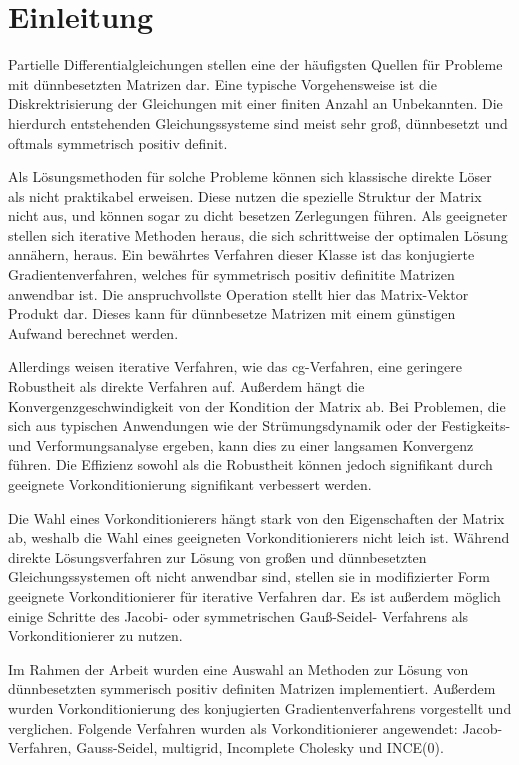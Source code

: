 \section{Einleitung}
Partielle Differentialgleichungen stellen eine der h\"aufigsten Quellen f\"ur Probleme mit d\"unnbesetzten Matrizen dar. Eine typische Vorgehensweise ist die Diskrektrisierung der Gleichungen mit einer finiten Anzahl an Unbekannten. Die hierdurch entstehenden Gleichungssysteme sind meist sehr gro\ss, d\"unnbesetzt und oftmals symmetrisch positiv definit.\cite{saad03:IMS}


Als L\"osungsmethoden f\"ur solche Probleme k\"onnen sich klassische direkte L\"oser  als nicht praktikabel erweisen. Diese nutzen die spezielle Struktur der Matrix nicht aus, und k\"onnen sogar zu dicht besetzen Zerlegungen f\"uhren. 
Als geeigneter stellen sich iterative Methoden heraus, die sich schrittweise der optimalen L\"osung ann\"ahern, heraus. Ein bew\"ahrtes Verfahren dieser Klasse ist das konjugierte Gradientenverfahren, welches für  symmetrisch positiv definitite Matrizen anwendbar ist. Die anspruchvollste Operation stellt hier das Matrix-Vektor Produkt dar. Dieses kann f\"ur d\"unnbesetze Matrizen mit einem g\"unstigen Aufwand berechnet werden. \cite{GoluVanl96}

Allerdings weisen iterative Verfahren, wie das cg-Verfahren, eine geringere Robustheit als direkte Verfahren auf. Au{\ss}erdem h\"angt die Konvergenzgeschwindigkeit von der Kondition der Matrix ab. Bei Problemen, die sich aus typischen Anwendungen wie der Str\"umungsdynamik oder der Festigkeits- und Verformungsanalyse ergeben, kann dies zu einer langsamen Konvergenz f\"uhren.
Die Effizienz sowohl als die Robustheit k\"onnen jedoch signifikant durch geeignete Vorkonditionierung signifikant verbessert werden. \cite{saad03:IMS}

Die Wahl eines Vorkonditionierers h\"angt stark von den Eigenschaften der Matrix ab, weshalb die Wahl eines geeigneten Vorkonditionierers nicht leich ist. W\"ahrend direkte L\"osungsverfahren zur L\"osung von gro{\ss}en und d\"unnbesetzten Gleichungssystemen oft nicht anwendbar sind, stellen sie in modifizierter Form geeignete Vorkonditionierer für iterative Verfahren dar. Es ist au{\ss}erdem m\"oglich einige Schritte des Jacobi- oder symmetrischen Gau{\ss}-Seidel-
Verfahrens als Vorkonditionierer zu nutzen. \cite{saad03:IMS}

Im Rahmen der Arbeit wurden eine Auswahl an Methoden zur L\"osung von d\"unnbesetzten symmerisch positiv definiten Matrizen implementiert. Au{\ss}erdem wurden Vorkonditionierung des konjugierten Gradientenverfahrens vorgestellt und verglichen. Folgende Verfahren wurden als Vorkonditionierer angewendet: Jacob-Verfahren, Gauss-Seidel, multigrid, Incomplete Cholesky und INCE(0).

